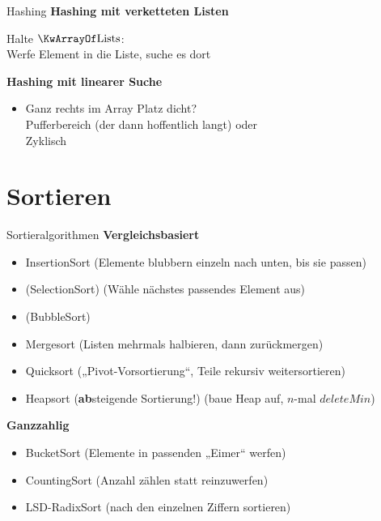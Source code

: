 \begin{frame}{Hashing}	
	\textbf{Hashing mit verketteten Listen}
	\begin{itemize}
		\implitem Halte $\KwArrayOf \text{Lists}$: \\ 
		Werfe Element in die Liste, suche es dort
	\end{itemize}
	\pause
	\textbf{Hashing mit linearer Suche}
	\begin{itemize}
		\implitem Nur $\KwArrayOf \text{Element}$: \\
		Platz besetzt? Gucke rechts davon. \\
		Beim \textbf{Löschen}: Ggfs. wieder nach links zurückschieben, damit Lücken wieder zu!
		\item Ganz rechts im Array Platz dicht? \\
		\impl Pufferbereich (der dann hoffentlich langt)  \quad oder \\
		\impl Zyklisch 
	\end{itemize}
\end{frame}
	


\section{Sortieren}

\begin{frame}{Sortieralgorithmen}
	\textbf{Vergleichsbasiert}
	\begin{itemize}
		\item InsertionSort \hfill {\small (Elemente blubbern einzeln nach unten, bis sie passen)}
		\item (SelectionSort) \hfill {\small (Wähle nächstes passendes Element aus)}
		\item (BubbleSort) 
		\item Mergesort \hfill {\small (Listen mehrmals halbieren, dann zurückmergen)}
		\item Quicksort \hfill  {\small („Pivot-Vorsortierung“, Teile rekursiv weitersortieren)} 
		\item Heapsort (\textbf{ab}steigende Sortierung!) \hfill {\small (baue Heap auf, $n$-mal $deleteMin$)}  
	\end{itemize}
	\textbf{Ganzzahlig}
	\begin{itemize}
		\item BucketSort \hfill {\small (Elemente in passenden „Eimer“ werfen)}
		\item CountingSort \hfill {\small (Anzahl zählen statt reinzuwerfen)}
		\item LSD-RadixSort \hfill {\small (nach den einzelnen Ziffern sortieren)}
	\end{itemize}
\end{frame}

